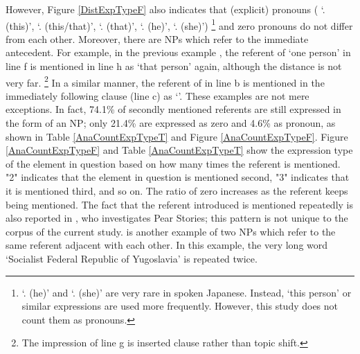 However,
Figure \ref{DistExpTypeF} also indicates that
(explicit) pronouns ( `. (this)',  `. (this/that)',  `. (that)',  `. (he)',  `. (she)')%
	\footnote{
	 `. (he)' and  `. (she)' are very rare in spoken Japanese.
	Instead,  `this person' or similar expressions are used more frequently.
	However, this study does not count them as pronouns.
	}
and zero pronouns do not differ from each other.
Moreover, there are NPs which refer to the immediate antecedent.
For example, in the previous example \Last,
the referent of  `one person' in line f is mentioned in line h as  `that person' again,
although the distance is not very far.%
	\footnote{
	The impression of line g is inserted clause rather than topic shift.
	}
In a similar manner,
the referent of  in line b is mentioned in the immediately following clause (line c) as  `'.
These examples are not mere exceptions.
In fact, 74.1\% of secondly mentioned referents are still expressed in the form of an NP;
only 21.4\% are expressed as zero and 4.6\% as pronoun,
as shown in Table \ref{AnaCountExpTypeT} and Figure \ref{AnaCountExpTypeF}.
Figure \ref{AnaCountExpTypeF} and Table \ref{AnaCountExpTypeT} show
the expression type of the element in question based on how many times the referent is mentioned.
"2" indicates that the element in question is mentioned second,
"3" indicates that it is mentioned third, and so on.
The ratio of zero increases as the referent keeps being mentioned.
The fact that the referent introduced is mentioned repeatedly is also reported in , who investigates Pear Stories;
this pattern is not unique to the corpus of the current study.
\Next is another example
of two NPs which refer to the same referent adjacent with each other.
In this example,
the very long word  `Socialist Federal Republic of Yugoslavia' is repeated twice.

